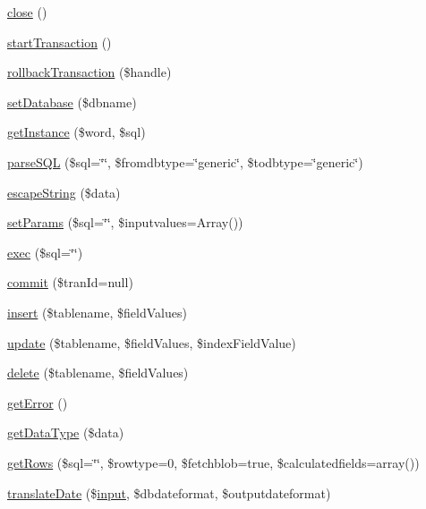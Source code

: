 \begin{DoxyCompactItemize}
\item 
\hyperlink{classDebby_a06df5effa73c9b99f02d0fdeebecbf0f}{close} ()
\item 
\hyperlink{classDebby_ad97845c3825dd2a5c44a8dcfc6bfda65}{start\+Transaction} ()
\item 
\hyperlink{classDebby_acbf53661ff480214270460ed6c3c915f}{rollback\+Transaction} (\$handle)
\item 
\hyperlink{classDebby_a462573b994e1cd2bdbe58c43232187d3}{set\+Database} (\$dbname)
\item 
\hyperlink{classDebby_a84bc3c4e3d17a383ed9d52601307be51}{get\+Instance} (\$word, \$sql)
\item 
\hyperlink{classDebby_a158d8946c888e34ad361f91645c21084}{parse\+S\+Q\+L} (\$sql=\char`\"{}\char`\"{}, \$fromdbtype=\char`\"{}generic\char`\"{}, \$todbtype=\char`\"{}generic\char`\"{})
\item 
\hyperlink{classDebby_a6bb2e5dfb70e57d980b9141ac44d0899}{escape\+String} (\$data)
\item 
\hyperlink{classDebby_a3e22f5b7c5524ca41f92ed4cb4bb50ed}{set\+Params} (\$sql=\char`\"{}\char`\"{}, \$inputvalues=Array())
\item 
\hyperlink{classDebby_a246a7d5268c855f26ce31f4088ce56e9}{exec} (\$sql=\char`\"{}\char`\"{})
\item 
\hyperlink{classDebby_abd1a0612de8d8558a155fa40754fb2c6}{commit} (\$tran\+Id=null)
\item 
\hyperlink{classDebby_aafffcf8afae3d308853f4452cd09babe}{insert} (\$tablename, \$field\+Values)
\item 
\hyperlink{classDebby_a482145f057ea4b31d4414d0ea8997244}{update} (\$tablename, \$field\+Values, \$index\+Field\+Value)
\item 
\hyperlink{classDebby_a5d6fa243fcf4b98b0c7d295136a32d5e}{delete} (\$tablename, \$field\+Values)
\item 
\hyperlink{classDebby_ae9d2704d501f1950be4bf08e4aecc3e7}{get\+Error} ()
\item 
\hyperlink{classDebby_ac478861de694f44be2d1caceb24b42da}{get\+Data\+Type} (\$data)
\item 
\hyperlink{classDebby_a0f983cda85b634ae248dd528a605ce56}{get\+Rows} (\$sql=\char`\"{}\char`\"{}, \$rowtype=0, \$fetchblob=true, \$calculatedfields=array())
\item 
\hyperlink{classDebby_a869768fbe62f60229e62cfe2fce9f1e2}{translate\+Date} (\$\hyperlink{Shape_8php_a6210da308e7ce036a6362dca3018d6db}{input}, \$dbdateformat, \$outputdateformat)
\item 

\end{DoxyCompactItemize}
